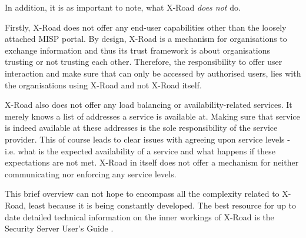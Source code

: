 \documentclass[10pt,a4paper]{article}
\begin{document}
\begin{appendices}
In addition, it is as important to note, what X-Road \emph{does not} do. 

Firstly, X-Road does not offer any end-user capabilities other than the loosely attached MISP portal. By design, X-Road is a mechanism for organisations to exchange information and thus its trust framework is about organisations trusting or not trusting each other. Therefore, the responsibility to offer user interaction and make sure that can only be accessed by authorised users, lies with the organisations using X-Road and not X-Road itself.

X-Road also does not offer any load balancing or availability-related services. It merely knows a list of addresses a service is available at. Making sure that service is indeed available at these addresses is the sole responsibility of the service provider. This of course leads to clear issues with agreeing upon service levels - i.e. what is the expected availability of a service and what happens if these expectations are not met. X-Road in itself does not offer a mechanism for neither communicating nor enforcing any service levels. 

This brief overview can not hope to encompass all the complexity related to X-Road, least because it is being constantly developed. The best resource for up to date detailed technical information on the inner workings of X-Road is the Security Server User's Guide \cite{xroadmanual}. 
\end{appendices}
\clearpage


 
\printindex
\end{document}
